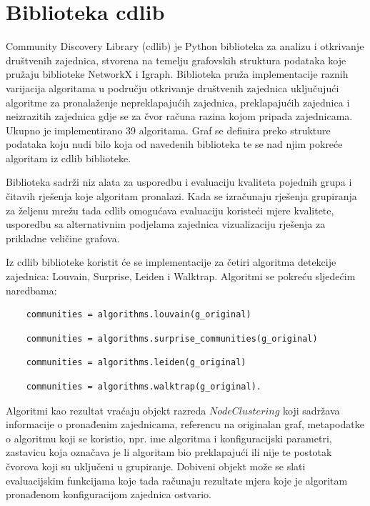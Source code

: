\pagebreak

\section{Biblioteka cdlib}
Community Discovery Library (cdlib) \cite{rossetti2019cdlib} je Python biblioteka za analizu i otkrivanje društvenih zajednica, stvorena na temelju grafovskih struktura podataka koje pružaju biblioteke NetworkX i Igraph. Biblioteka pruža implementacije raznih varijacija algoritama u području otkrivanje društvenih zajednica uključujući algoritme za pronalaženje nepreklapajućih zajednica, preklapajućih zajednica i neizrazitih zajednica gdje se za čvor računa razina kojom pripada zajednicama. Ukupno je implementirano 39 algoritama. Graf se definira preko strukture podataka koju nudi bilo koja od navedenih biblioteka te se nad njim pokreće algoritam iz cdlib biblioteke.

Biblioteka sadrži niz alata za usporedbu i evaluaciju kvaliteta pojednih grupa i čitavih rješenja koje algoritam pronalazi. Kada se izračunaju rješenja grupiranja za željenu mrežu tada cdlib omogućava evaluaciju koristeći mjere kvalitete, usporedbu sa alternativnim podjelama zajednica vizualizaciju rješenja za prikladne veličine grafova.

Iz cdlib biblioteke koristit će se implementacije za četiri algoritma detekcije zajednica: Louvain, Surprise, Leiden i Walktrap. Algoritmi se pokreću sljedećim naredbama:

\begin{verbatim}
	communities = algorithms.louvain(g_original)
\end{verbatim}


\begin{verbatim}
	communities = algorithms.surprise_communities(g_original)
\end{verbatim}

\begin{verbatim}
	communities = algorithms.leiden(g_original)
\end{verbatim}

\begin{verbatim}
	communities = algorithms.walktrap(g_original).
\end{verbatim}


Algoritmi kao rezultat vraćaju objekt razreda $NodeClustering$ koji sadržava informacije o pronađenim zajednicama, referencu na originalan graf, metapodatke o algoritmu koji se koristio, npr. ime algoritma i konfiguracijski parametri, zastavicu koja označava je li algoritam bio preklapajući ili nije te postotak čvorova koji su uključeni u grupiranje. Dobiveni objekt može se slati evaluacijskim funkcijama koje tada računaju rezultate mjera koje je algoritam pronađenom konfiguracijom zajednica ostvario.